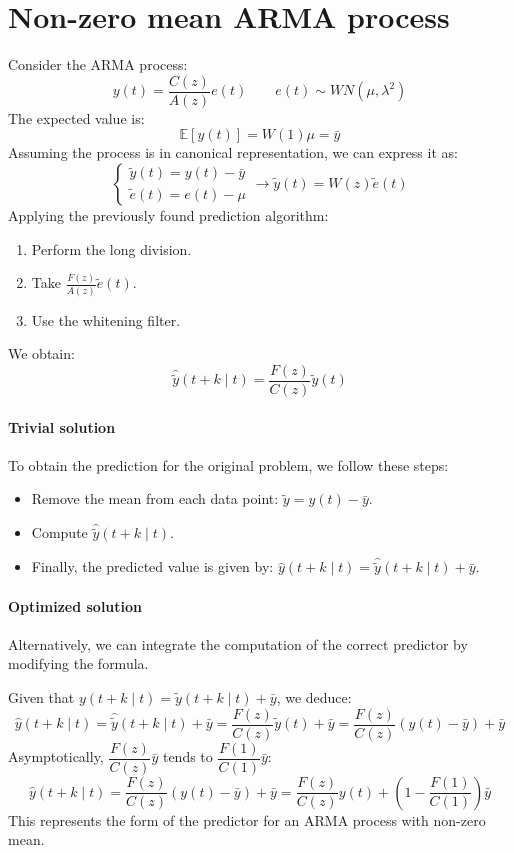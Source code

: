 \section{Non-zero mean ARMA process}

Consider the ARMA process:
\[y(t)=\dfrac{C(z)}{A(z)}e(t) \qquad e(t)\sim WN(\mu,\lambda^2)\]
The expected value is:
\[\mathbb{E}\left[y(t)\right]=W(1)\mu=\bar{y}\]
Assuming the process is in canonical representation, we can express it as:
\[\begin{cases}
    \tilde{y}(t)=y(t)-\bar{y} \\
    \tilde{e}(t)=e(t)-\mu 
\end{cases} \rightarrow \tilde{y}(t)=W(z)\tilde{e}(t)\]
Applying the previously found prediction algorithm:
\begin{enumerate}
    \item Perform the long division.
    \item Take $\frac{F(z)}{A(z)}\tilde{e}(t)$. 
    \item Use the whitening filter.
\end{enumerate}
We obtain:
\[\hat{\tilde{y}}(t+k\mid t)=\dfrac{F(z)}{C(z)}\tilde{y}(t)\]

\paragraph*{Trivial solution}
To obtain the prediction for the original problem, we follow these steps:
\begin{itemize}
    \item Remove the mean from each data point: $\tilde{y}=y(t)-\bar{y}$. 
    \item Compute $\hat{\tilde{y}}(t+k\mid t)$. 
    \item Finally, the predicted value is given by: $\hat{y}(t+k\mid t)=\hat{\tilde{y}}(t+k\mid t)+\bar{y}$.
\end{itemize}

\paragraph*{Optimized solution}
Alternatively, we can integrate the computation of the correct predictor by modifying the formula.

Given that $y(t+k\mid t)=\tilde{y}(t+k\mid t)+\bar{y}$, we deduce:
\[\hat{y}(t+k\mid t)=\hat{\tilde{y}}(t+k\mid t)+\bar{y}=\dfrac{F(z)}{C(z)}\tilde{y}(t)+\bar{y}=\dfrac{F(z)}{C(z)}(y(t)-\bar{y})+\bar{y} \]
Asymptotically, $\dfrac{F(z)}{C(z)}\bar{y}$ tends to $\dfrac{F(1)}{C(1)}\bar{y}$:
\[\hat{y}(t+k\mid t)=\dfrac{F(z)}{C(z)}(y(t)-\bar{y})+\bar{y}=\dfrac{F(z)}{C(z)}y(t) + \left(1-\dfrac{F(1)}{C(1)}\right)\bar{y}\]
This represents the form of the predictor for an ARMA process with non-zero mean.